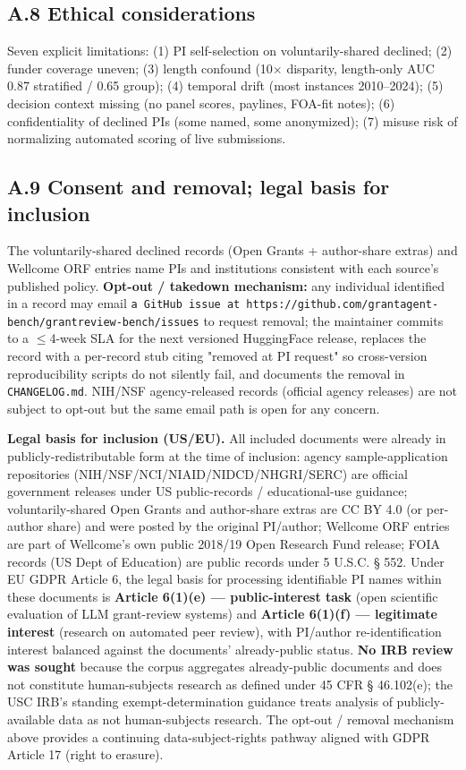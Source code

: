 \documentclass[11pt]{article}
\begin{document}
\subsection{A.8 Ethical considerations}
Seven explicit limitations: (1) PI self-selection on voluntarily-shared declined; (2) funder coverage uneven; (3) length confound (10$\times$ disparity, length-only AUC 0.87 stratified / 0.65 group); (4) temporal drift (most instances 2010--2024); (5) decision context missing (no panel scores, paylines, FOA-fit notes); (6) confidentiality of declined PIs (some named, some anonymized); (7) misuse risk of normalizing automated scoring of live submissions.

\subsection{A.9 Consent and removal; legal basis for inclusion}
The voluntarily-shared declined records (Open Grants + author-share extras) and Wellcome ORF entries name PIs and institutions consistent with each source's published policy. \textbf{Opt-out / takedown mechanism:} any individual identified in a record may email \texttt{a GitHub issue at https://github.com/grantagent-bench/grantreview-bench/issues} to request removal; the maintainer commits to a $\leq$4-week SLA for the next versioned HuggingFace release, replaces the record with a per-record stub citing "removed at PI request" so cross-version reproducibility scripts do not silently fail, and documents the removal in \texttt{CHANGELOG.md}. NIH/NSF agency-released records (official agency releases) are not subject to opt-out but the same email path is open for any concern.

\textbf{Legal basis for inclusion (US/EU).} All included documents were already in publicly-redistributable form at the time of inclusion: agency sample-application repositories (NIH/NSF/NCI/NIAID/NIDCD/NHGRI/SERC) are official government releases under US public-records / educational-use guidance; voluntarily-shared Open Grants and author-share extras are CC BY 4.0 (or per-author share) and were posted by the original PI/author; Wellcome ORF entries are part of Wellcome's own public 2018/19 Open Research Fund release; FOIA records (US Dept of Education) are public records under 5 U.S.C. § 552. Under EU GDPR Article 6, the legal basis for processing identifiable PI names within these documents is \textbf{Article 6(1)(e) --- public-interest task} (open scientific evaluation of LLM grant-review systems) and \textbf{Article 6(1)(f) --- legitimate interest} (research on automated peer review), with PI/author re-identification interest balanced against the documents' already-public status. \textbf{No IRB review was sought} because the corpus aggregates already-public documents and does not constitute human-subjects research as defined under 45 CFR § 46.102(e); the USC IRB's standing exempt-determination guidance treats analysis of publicly-available data as not human-subjects research. The opt-out / removal mechanism above provides a continuing data-subject-rights pathway aligned with GDPR Article 17 (right to erasure).
\end{document}
